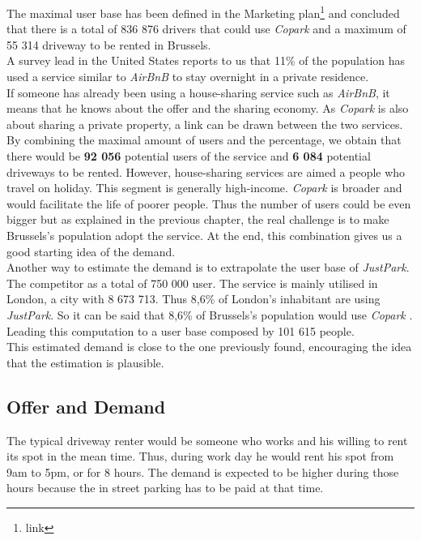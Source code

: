 \documentclass[12pt,a4paper,oneside]{book}
\newcommand{\bp}{\textit{Copark }}
\begin{document}
\label{mubsec}

The maximal user base has been defined in the Marketing plan\footnote{link} and concluded that there is a total of 836 876 drivers that could use \bp and a maximum of 55 314 driveway to be rented in Brussels.\\

A survey lead in the United States reports to us that 11\% of the population has used a service similar to \textit{AirBnB} to stay overnight in a private residence.\cite{airbnbuse}\\
If someone has already been using a house-sharing service such as \textit{AirBnB}, it means that he knows about the offer and the sharing economy. As \bp is also about sharing a private property, a link can be drawn between the two services.\\

By combining the maximal amount of users and the percentage, we obtain that there would be \textbf{92 056} potential users of the service and \textbf{6 084} potential driveways to be rented. However, house-sharing services are aimed a people who travel on holiday. This segment is generally high-income. \bp is broader and would facilitate the life of poorer people. Thus the number of users could be even bigger but as explained in the previous chapter, the real challenge is to make Brussels's population adopt the service. At the end, this combination gives us a good starting idea of the demand.\\

Another way to estimate the demand is to extrapolate the user base of \textit{JustPark}. The competitor as a total of 750 000 user\cite{jpu}. The service is mainly utilised in London, a city with 8 673 713.\cite{ciafb} Thus 8,6\% of London's inhabitant are using \textit{JustPark}. So it can be said that 8,6\% of Brussels's population would use \bp. Leading this computation to a user base composed by 101 615 people.\\
This estimated demand is close to the one previously found, encouraging the idea that the estimation is plausible.\\

\subsection{Offer and Demand}

The typical driveway renter would be someone who works and his willing to rent its spot in the mean time. Thus, during work day he would rent his spot from 9am to 5pm, or for 8 hours. The demand is expected to be higher during those hours because the in street parking has to be paid at that time.\\
\end{document}
